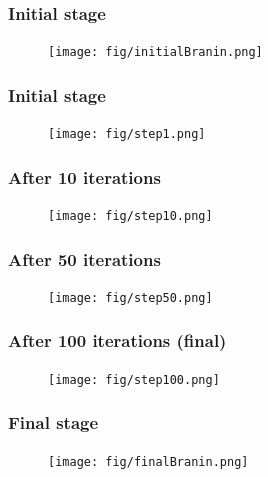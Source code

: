 \documentclass[10pt]{beamer}
\begin{document}
\frame
{
\frametitle{Initial stage}
\begin{figure}[h!] \centering \texttt{[image: fig/initialBranin.png]}\end{figure}
}
\frame
{\frametitle{Initial stage}
\begin{figure}[h!] \centering \vspace{-3mm} \texttt{[image: fig/step1.png]}\end{figure}}
\frame
{\frametitle{After 10 iterations}
\begin{figure}[h!] \centering \vspace{-3mm} \texttt{[image: fig/step10.png]}\end{figure}}
\frame
{\frametitle{After 50 iterations}
\begin{figure}[h!] \centering \vspace{-3mm} \texttt{[image: fig/step50.png]}\end{figure}}
\frame
{\frametitle{After 100 iterations (final)}
\begin{figure}[h!] \centering \vspace{-3mm} \texttt{[image: fig/step100.png]}\end{figure}}
\frame
{\frametitle{Final stage}
\begin{figure}[h!] \centering \texttt{[image: fig/finalBranin.png]} \end{figure}}
\frame
\end{document}
